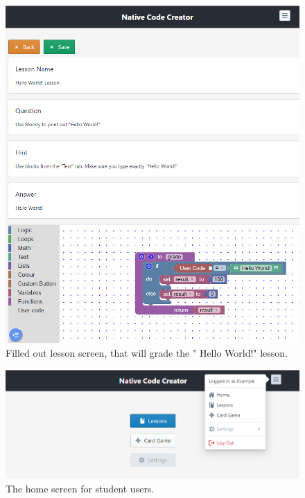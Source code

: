 \documentclass[draftclsnofoot,10pt,onecolumn]{IEEEtran}
\begin{document}
\begin{figure}[h]
    \centering
    \includegraphics[width=\textwidth]{caps7}
    \caption{Filled out lesson screen, that will grade the " Hello World!" lesson.}
\end{figure}

\begin{figure}[h]
    \centering
    \includegraphics[width=\textwidth]{caps8}
    \caption{The home screen for student users.}
\end{figure}
\end{document}
